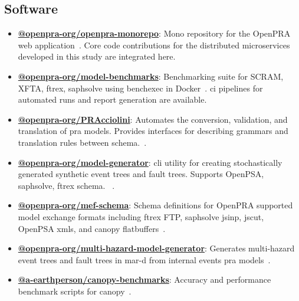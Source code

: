 \subsection{Software}
\begin{itemize}
    \item {\textbf{\href{https://github.com/openpra-org/openpra-monorepo}{@openpra-org/openpra-monorepo}}: Mono repository for the OpenPRA web application~\cite{openpra_initiative_openpra_2024}}. Core code contributions for the distributed microservices developed in this study are integrated here.
    
    \item {\textbf{\href{https://github.com/openpra-org/model-benchmarks}{@openpra-org/model-benchmarks}}: Benchmarking suite for SCRAM, XFTA, \acrshort{ftrex}, \acrshort{saphsolve} using benchexec in Docker~\cite{earthperson_pra_2025}}. \acrlong{ci} pipelines for automated runs and report generation are available.

    \item {\textbf{\href{https://github.com/openpra-org/PRAcciolini}{@openpra-org/PRAcciolini}}: Automates the conversion, validation, and translation of \acrshort{pra} models. Provides interfaces for describing grammars and translation rules between schema.~\cite{earthperson_pracciolini_2024}}.
    
    \item {\textbf{\href{https://github.com/openpra-org/model-generator}{@openpra-org/model-generator}}: \acrshort{cli} utility for creating stochastically generated synthetic event trees and fault trees. Supports OpenPSA, \acrshort{saphsolve}, \acrshort{ftrex} schema. ~\cite{earthperson_pra_2022}}.
    
    \item {\textbf{\href{https://github.com/openpra-org/mef-schema}{@openpra-org/mef-schema}}: Schema definitions for OpenPRA supported model exchange formats including \acrshort{ftrex} FTP, \acrshort{saphsolve} \acrshort{jsinp}, \acrshort{jscut}, OpenPSA \acrshort{xml}s, and canopy flatbuffers~\cite{earthperson_pra_2024}}.
    
    \item {\textbf{\href{https://github.com/openpra-org/multi-hazard-model-generator}{@openpra-org/multi-hazard-model-generator}}: Generates multi-hazard event trees and fault trees in \acrshort{mar-d} from internal events \acrshort{pra} models~\cite{batikh_multi_2023}}.
    
    \item {\textbf{\href{https://github.com/a-earthperson/canopy-benchmarks}{@a-earthperson/canopy-benchmarks}}: Accuracy and performance benchmark scripts for canopy~\cite{earthperson_canopy_2025}}.
\end{itemize}